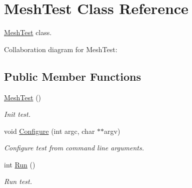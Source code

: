\hypertarget{classMeshTest}{}\section{Mesh\+Test Class Reference}
\label{classMeshTest}


\hyperlink{classMeshTest}{Mesh\+Test} class.  




Collaboration diagram for Mesh\+Test\+:
\subsection*{Public Member Functions}
\begin{DoxyCompactItemize}
\item 
\hyperlink{classMeshTest_af01926a5972fb052909ae5ea08e0f122}{Mesh\+Test} ()
\begin{DoxyCompactList}\small\item\em Init test. \end{DoxyCompactList}\item 
void \hyperlink{classMeshTest_ad608dd51da59550b84b31a5ec71b71fb}{Configure} (int argc, char $\ast$$\ast$argv)
\begin{DoxyCompactList}\small\item\em Configure test from command line arguments. \end{DoxyCompactList}\item 
int \hyperlink{classMeshTest_aef875ab767a18a8732de07aea724681c}{Run} ()
\begin{DoxyCompactList}\small\item\em Run test. \end{DoxyCompactList}\end{DoxyCompactItemize}
